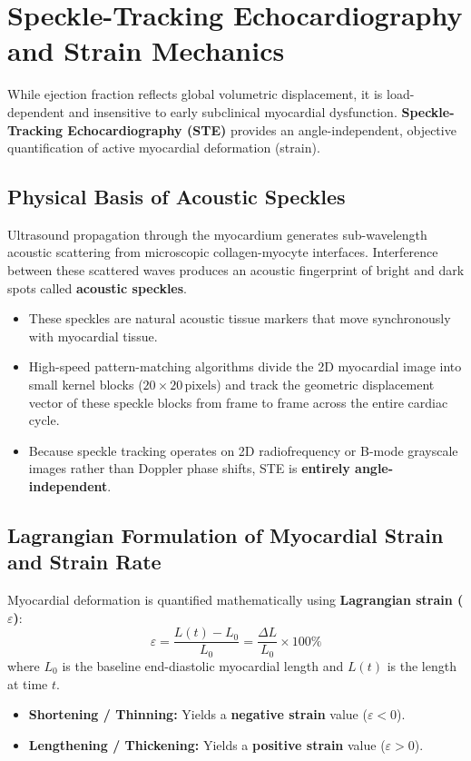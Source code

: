 \documentclass[11pt,a4paper]{article}
\begin{document}
\newpage
\section{Speckle-Tracking Echocardiography and Strain Mechanics}

While ejection fraction reflects global volumetric displacement, it is load-dependent and insensitive to early subclinical myocardial dysfunction. \textbf{Speckle-Tracking Echocardiography (STE)} provides an angle-independent, objective quantification of active myocardial deformation (strain).

\subsection{Physical Basis of Acoustic Speckles}

Ultrasound propagation through the myocardium generates sub-wavelength acoustic scattering from microscopic collagen-myocyte interfaces. Interference between these scattered waves produces an acoustic fingerprint of bright and dark spots called \textbf{acoustic speckles}. 
\begin{itemize}[leftmargin=*]
    \item These speckles are natural acoustic tissue markers that move synchronously with myocardial tissue.
    \item High-speed pattern-matching algorithms divide the 2D myocardial image into small kernel blocks ($20 \times 20\,\text{pixels}$) and track the geometric displacement vector of these speckle blocks from frame to frame across the entire cardiac cycle.
    \item Because speckle tracking operates on 2D radiofrequency or B-mode grayscale images rather than Doppler phase shifts, STE is \textbf{entirely angle-independent}.
\end{itemize}

\subsection{Lagrangian Formulation of Myocardial Strain and Strain Rate}

Myocardial deformation is quantified mathematically using \textbf{Lagrangian strain ($\varepsilon$)}:
\begin{equation}
    \varepsilon = \frac{L(t) - L_0}{L_0} = \frac{\Delta L}{L_0} \times 100\%
\end{equation}
where $L_0$ is the baseline end-diastolic myocardial length and $L(t)$ is the length at time $t$. 
\begin{itemize}[leftmargin=*]
    \item \textbf{Shortening / Thinning:} Yields a \textbf{negative strain} value ($\varepsilon < 0$).
    \item \textbf{Lengthening / Thickening:} Yields a \textbf{positive strain} value ($\varepsilon > 0$).
\end{itemize}
\end{document}
